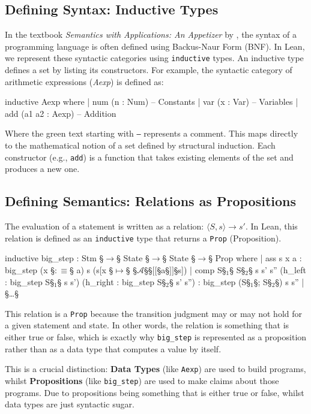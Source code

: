 \subsection{Defining Syntax: Inductive Types}
In the textbook \emph{Semantics with Applications: An Appetizer} by \cite{nielson_semantics_2007},
the syntax of a programming language is often defined using Backus-Naur Form (BNF).
In Lean, we represent these syntactic categories using \texttt{inductive} types.
An inductive type defines a set by listing its constructors.
For example, the syntactic category of arithmetic expressions (\textit{Aexp}) is defined as:

\begin{Lean_Code}
inductive Aexp where
  | num (n : Num)          -- Constants
  | var (x : Var)          -- Variables
  | add (a1 a2 : Aexp)     -- Addition
\end{Lean_Code}
\noindent
Where the green text starting with \texttt{--} represents a comment.
This maps directly to the mathematical notion of a set defined by structural induction.
Each constructor (e.g., \texttt{add}) is a function
that takes existing elements of the set and produces a new one.

\subsection{Defining Semantics: Relations as Propositions}
The evaluation of a statement is written as a relation: $\langle S, s \rangle \to s'$. 
In Lean, this relation is defined as an \texttt{inductive} type that returns
a \texttt{Prop} (Proposition).
\begin{Lean_Code}
inductive big_step : Stm §\(\to\)§ State §\(\to\)§ State §\(\to\)§ Prop where
    | ass {s x a} :
            big_step (x §\(:\equiv\)§ a) s (s[x §\(\mapsto\)§ §\(\mathcal{A}\)§§\([\![\)§a§\(]\!]\)§s])
    | comp {S§\(_1\)§ S§\(_2\)§ s s' s''}
        (h_left  : big_step S§\(_1\)§ s s')
        (h_right : big_step S§\(_2\)§ s' s'') :
            big_step (S§\(_1\)§; S§\(_2\)§) s s''
    | §\dots§
\end{Lean_Code}

This relation is a \texttt{Prop} because the transition judgment may or may not hold for a given statement and state.
In other words, the relation is something that is either true or false, which is exactly why \texttt{big\_step} is represented as a proposition rather than as a data type that computes a value by itself.

This is a crucial distinction: \textbf{Data Types} (like \texttt{Aexp}) are used to build programs,
whilst \textbf{Propositions} (like \texttt{big\_step}) are used to make claims about those programs.
Due to propositions being something  that is either true or false, whilst data types are just syntactic sugar.

